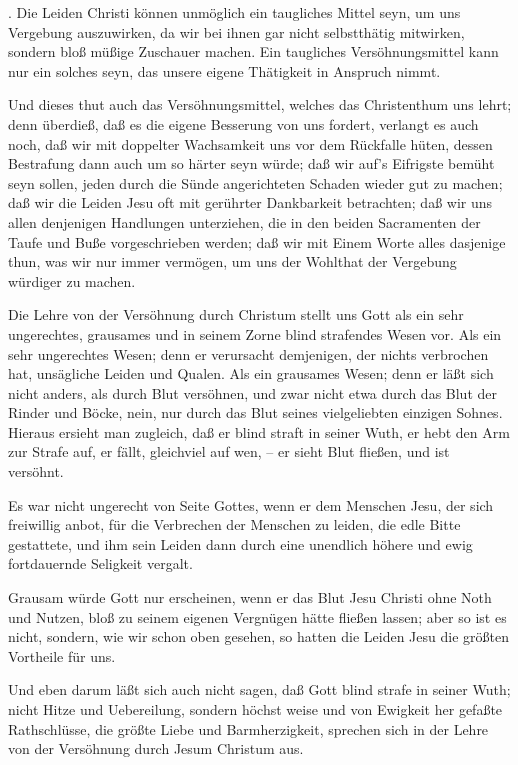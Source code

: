 \begin{aufza}
. Die Leiden Christi können unmöglich ein taugliches Mittel seyn, um uns Vergebung auszuwirken, da wir bei ihnen gar nicht selbstthätig mitwirken, sondern bloß müßige Zuschauer machen. Ein taugliches Versöhnungsmittel kann nur ein solches seyn, das unsere eigene Thätigkeit in Anspruch nimmt.\par
{} Und dieses thut auch das Versöhnungsmittel, welches das Christenthum uns lehrt; denn überdieß, daß es die eigene Besserung von uns fordert, verlangt es auch noch, daß wir mit doppelter Wachsamkeit uns vor dem Rückfalle hüten, dessen Bestrafung dann auch um so härter seyn würde; daß wir auf's Eifrigste bemüht seyn sollen, jeden durch die Sünde angerichteten Schaden wieder gut zu machen; daß wir die Leiden Jesu oft mit gerührter Dankbarkeit betrachten; daß wir uns allen denjenigen Handlungen unterziehen, die in den beiden Sacramenten der Taufe und Buße vorgeschrieben werden; daß wir mit Einem Worte alles dasjenige thun, was wir nur immer vermögen, um uns der Wohlthat der Vergebung würdiger zu machen.\par
{} Die Lehre von der Versöhnung durch Christum stellt uns Gott als ein sehr ungerechtes, grausames und in seinem Zorne blind strafendes Wesen vor. Als ein sehr ungerechtes Wesen; denn er verursacht demjenigen, der nichts verbrochen hat, unsägliche Leiden und Qualen. Als ein grausames Wesen; denn er läßt sich nicht anders, als durch Blut versöhnen, und zwar nicht etwa durch das Blut der Rinder und Böcke, nein, nur durch das Blut seines vielgeliebten einzigen Sohnes. Hieraus ersieht man zugleich, daß er blind straft in seiner Wuth, er hebt den Arm zur Strafe auf, er fällt, gleichviel auf wen, -- er sieht Blut fließen, und ist versöhnt.~\par
{}
\begin{aufzc}
\item Es war nicht ungerecht von Seite Gottes, wenn er dem Menschen Jesu, der sich freiwillig anbot, für die Verbrechen der Menschen zu leiden, die edle Bitte gestattete, und ihm sein Leiden dann durch eine unendlich höhere und ewig fortdauernde Seligkeit vergalt.
\item Grausam würde Gott nur erscheinen, wenn er das Blut Jesu Christi ohne Noth und Nutzen, bloß zu seinem eigenen Vergnügen hätte fließen lassen; aber so ist es nicht, sondern, wie wir schon oben gesehen, so hatten die Leiden Jesu die größten Vortheile für uns.
\item Und eben darum läßt sich auch nicht sagen, daß Gott blind strafe in seiner Wuth; nicht Hitze und Uebereilung, sondern höchst weise und von Ewigkeit her gefaßte Rathschlüsse, die größte Liebe und Barmherzigkeit, sprechen sich in der Lehre von der Versöhnung durch Jesum Christum aus.

\end{aufzc}
\end{aufza}
